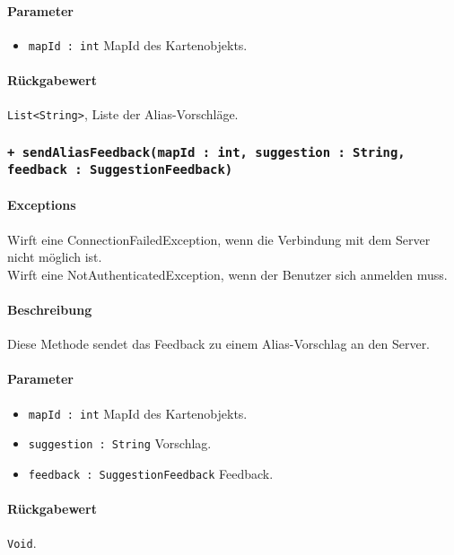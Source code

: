 \paragraph*{Parameter}
\begin{itemize}
    \item \texttt{mapId : int} MapId des Kartenobjekts.
\end{itemize}
\paragraph*{Rückgabewert}
\texttt{List<String>}, Liste der Alias-Vorschläge.

\subsubsection*{\texttt{+ sendAliasFeedback(mapId : int, suggestion : String, feedback : SuggestionFeedback)}}\label{App_AddAlias_IAliasDataProvider_sendAliasFeedback}%
\paragraph*{Exceptions}
Wirft eine ConnectionFailedException, wenn die Verbindung mit dem Server nicht möglich ist.\\
Wirft eine NotAuthenticatedException, wenn der Benutzer sich anmelden muss.
\paragraph*{Beschreibung}
Diese Methode sendet das Feedback zu einem Alias-Vorschlag an den Server.
\paragraph*{Parameter}
\begin{itemize}
    \item \texttt{mapId : int} MapId des Kartenobjekts.
    \item \texttt{suggestion : String} Vorschlag. 
    \item \texttt{feedback : SuggestionFeedback} Feedback.
\end{itemize}
\paragraph*{Rückgabewert}
\texttt{Void}.